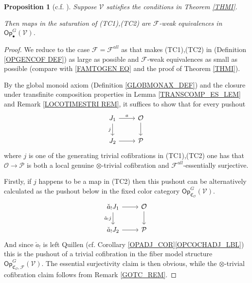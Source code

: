 \documentclass[a4paper,10pt
,draft
]{article}%
\numberwithin{equation}{section}
\numberwithin{figure}{section}
\newtheorem{proposition}[equation]{Proposition}%
\theoremstyle{definition} %
\newcommand{\F}{\ensuremath{\mathcal F}}
\newcommand{\V}{\ensuremath{\mathcal V}}
\renewcommand{\O}{\ensuremath{\mathcal O}}
\renewcommand{\P}{\ensuremath{\mathcal P}}
\newcommand{\1}{\ensuremath{\mathbbm 1}}%
\begin{document}
\begin{proposition}[{c.f. \cite[4.20]{Cav}}]\label{J-CELL_PROP}
	Suppose $\V$ satisfies the conditions in Theorem \ref{THMI}.
      
	Then maps in the saturation of (TC1),(TC2) 
	are $\F$-weak equivalences in $\mathsf{Op}^G_{\bullet}(\V)$.
\end{proposition}



\begin{proof}
	We reduce to the case
	$\F=\F^{all}$ as that makes (TC1),(TC2) in (Definition \ref{OPGENCOF DEF}) as large as possible 
	and $\mathcal{F}$-weak equivalences as small as possible
	(compare with \eqref{FAMTOGEN EQ} and the proof of Theorem \ref{THMI}).
		
	By the global monoid axiom (Definition \ref{GLOBMONAX_DEF}) and
	the closure under transfinite composition properties in Lemma \ref{TRANSCOMP_ES_LEM} and Remark \ref{LOCOTIMESTRI REM},
	it suffices to show that for every pushout
\begin{equation}\label{JUSTAPUSH EQ}
\begin{tikzcd}
	J_1 \ar{r}{a} \arrow{d}[swap]{j}
&
	\O \arrow{d}
\\
	J_2 \ar{r} 
&
	\P
\end{tikzcd}
\end{equation}
	where $j$ is one of the generating trivial cofibrations 
	in (TC1),(TC2) 
	one has that 
	$\O \to \mathcal{P}$ is both a local genuine $\otimes$-trivial cofibration and $\F^{all}$-essentially surjective.

	Firstly, if $j$ happens to be a map in (TC2)
	then this pushout
	can be alternatively calculated as the pushout below
	in the fixed color category $\mathsf{Op}^{G}_{\mathfrak C_{\O}}(\V)$.
\begin{equation}
\begin{tikzcd}
\check{a}_!J_1 \ar{r} \arrow{d}[swap]{\check{a}_!j}
&
\O \arrow{d}
\\
\check{a}_!J_2 \ar{r} 
&
\P
\end{tikzcd}
\end{equation}      
      And since $\check{a}_!$ is left Quillen (cf. Corollary \ref{OPADJ_COR}\ref{OPCOCHADJ_LBL}) %
      this is the pushout of a trivial cofibration in the fiber model structure
      $\mathsf{Op}^{G}_{\mathfrak C_{\O},\F}(\V)$.
	The essential surjectivity claim is then obvious,
	while the $\otimes$-trivial cofibration
	claim follows from 
	Remark \ref{GOTC_REM}.


\end{proof}
\end{document}
